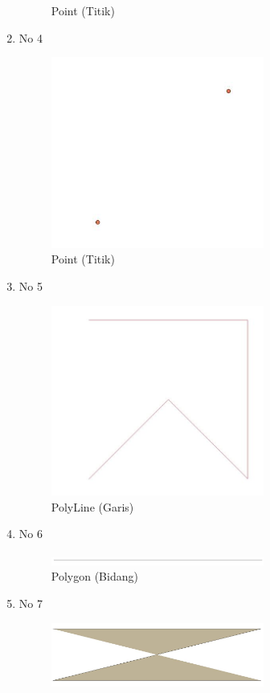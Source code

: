 \begin{enumerate}
\begin{figure}[H]
		\centering
		\caption{Point (Titik)}
	\end{figure}
	\item No 4
	
	\begin{figure}[H]
		\includegraphics[width=7cm]{figures/Tugas2/1174080/no4.JPG}
		\centering
		\caption{Point (Titik)}
	\end{figure}
	\item No 5
	
	\begin{figure}[H]
		\includegraphics[width=7cm]{figures/Tugas2/1174080/no5.JPG}
		\centering
		\caption{PolyLine (Garis)}
	\end{figure}
	\item No 6
	
	\begin{figure}[H]
		\includegraphics[width=7cm]{figures/Tugas2/1174080/no6.JPG}
		\centering
		\caption{Polygon (Bidang)}
	\end{figure}
	\item No 7
	
	\begin{figure}[H]
		\includegraphics[width=7cm]{figures/Tugas2/1174080/no7.JPG}

\end{figure}
\end{enumerate}

